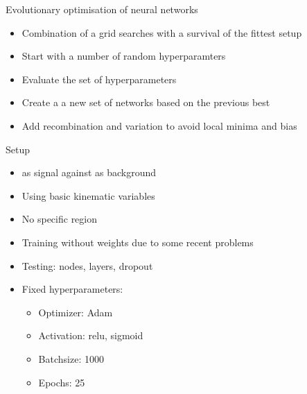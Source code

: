 \begin{frame}{Evolutionary optimisation of neural networks}
    \begin{itemize}
        \item Combination of a grid searches with a survival of the fittest setup
        \vspace{0.2cm}
        \item Start with a number of random hyperparamters
        \vspace{0.2cm}
        \item Evaluate the set of hyperparameters
        \vspace{0.2cm}
        \item Create a a new set of networks based on the previous best
        \vspace{0.2cm}
        \item Add recombination and variation to avoid local minima and bias
    \end{itemize}
\end{frame}



\begin{frame}{Setup}
    \begin{itemize}
        \item \tZq as signal against \ttbar as background
        \item Using basic kinematic variables
        \item No specific region
        \item Training without weights due to some recent problems
        \item Testing: nodes, layers, dropout
        \item Fixed hyperparameters:
            \begin{itemize}
                \item Optimizer: Adam
                \item Activation: relu, sigmoid
                \item Batchsize: 1000
                \item Epochs: 25
            \end{itemize}
    \end{itemize}
\end{frame}

